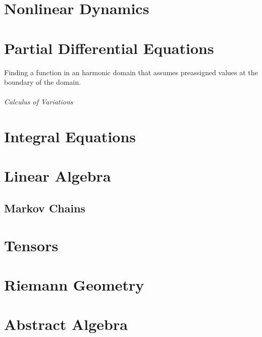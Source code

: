 \documentclass[12pt, english]{book}
\begin{document}
	\part{Nonlinear Dynamics} \label{Nonlinear Dynamics Part}
	
	
	\part{Partial Differential Equations} \label{Partial Differential Equations Part}
	
	\begin{definition}
		\label{Dirichlet Problem Definition - Partial}
		Finding a function in an harmonic domain that assumes preassigned values at the boundary of the domain.
	\end{definition}
	
	\paragraph{Calculus of Variations} \label{Calculus of Variations Part}
	
	\part{Integral Equations} \label{Integral Equations Part}
	
	
	\part{Linear Algebra} \label{Linear Algebra Part}
	
	\chapter{Markov Chains} \label{Markov Chains Chapter - Linear Algebra}
	
	
	\part{Tensors} \label{Tensors Part}
	
	
	\part{Riemann Geometry} \label{Reimann Geometry Part}
	
	
	\part{Abstract Algebra} \label{Abstract Algebra Part}
	
\end{document}

